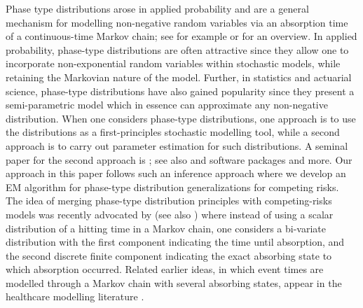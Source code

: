 \documentclass{article}
\begin{document}
Phase type distributions arose in applied probability and are a general mechanism for modelling non-negative random variables via an absorption time of a continuous-time Markov chain; see for example \citet{latouche_introduction_1999} or \citet{he_fundamentals_2014} for an overview. In applied probability, phase-type distributions are often attractive since they allow one to incorporate non-exponential random variables within stochastic models, while retaining the Markovian nature of the model. Further, in statistics and actuarial science, phase-type distributions have also gained popularity since they present a semi-parametric model which in essence can approximate any non-negative distribution. When one considers phase-type distributions, one approach is to use the distributions as a first-principles stochastic modelling tool, while a second approach is to carry out parameter estimation for such distributions. A seminal paper for the second approach is \citet{Asmussen1996FittingPD}; see also \citet{Olsson_1996_censored} and software packages \citep{matrixdist} and more. Our approach in this paper follows such an inference approach where we develop an EM algorithm for phase-type distribution generalizations for competing risks. The idea of merging phase-type distribution principles with competing-risks models was recently advocated by \citet{lindqvist_phase-type_2022} (see also \citep{garcia-maya_competing_2022}) where instead of using a scalar distribution of a hitting time in a Markov chain, one considers a bi-variate distribution with the first component indicating the time until absorption, and the second discrete finite component indicating the exact absorbing state to which absorption occurred. Related earlier ideas, in which event times are modelled through a Markov chain with several absorbing states, appear in the healthcare modelling literature \citep{marshall_mcclean_2004}.
\end{document}
